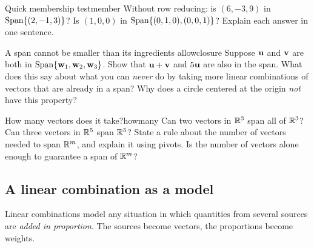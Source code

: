 \documentclass[11pt]{article}
\begin{document}
\begin{kc}{Quick membership test}{member}
Without row reducing: is $(6,-3,9)$ in $\operatorname{Span}\{(2,-1,3)\}$? Is $(1,0,0)$ in $\operatorname{Span}\{(0,1,0),(0,0,1)\}$? Explain each answer in one sentence.
\end{kc}

\begin{think}{A span cannot be smaller than its ingredients allow}{closure}
Suppose $\mathbf{u}$ and $\mathbf{v}$ are both in $\operatorname{Span}\{\mathbf{w}_1,\mathbf{w}_2,\mathbf{w}_3\}$. Show that $\mathbf{u}+\mathbf{v}$ and $5\mathbf{u}$ are
also in the span. What does this say about what you can \emph{never} do by taking more linear combinations of vectors that are
already in a span? Why does a circle centered at the origin \emph{not} have this property?
\end{think}

\begin{think}{How many vectors does it take?}{howmany}
Can two vectors in $\mathbb{R}^3$ span all of $\mathbb{R}^3$? Can three vectors in $\mathbb{R}^5$ span $\mathbb{R}^5$? State a rule about the number of vectors
needed to span $\mathbb{R}^m$, and explain it using pivots. Is the number of vectors alone enough to guarantee
a span of $\mathbb{R}^m$?
\end{think}

\subsection*{A linear combination as a model}

Linear combinations model any situation in which quantities from several sources are \emph{added in proportion}. The
sources become vectors, the proportions become weights.
\end{document}
